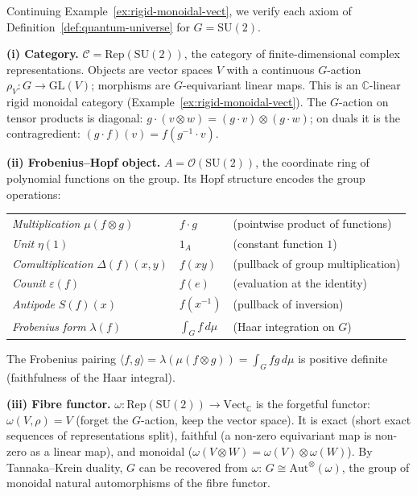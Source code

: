 \begin{example}
\label{ex:quantum-universe-su2}
Continuing Example~\ref{ex:rigid-monoidal-vect}, we verify each axiom
of Definition~\ref{def:quantum-universe} for $G = \mathrm{SU}(2)$.

\medskip\noindent\textbf{(i) Category.}\;
$\mathcal{C} = \mathrm{Rep}(\mathrm{SU}(2))$, the category of
finite-dimensional complex representations.  Objects are vector spaces
$V$ with a continuous $G$-action $\rho_V \colon G \to \mathrm{GL}(V)$;
morphisms are $G$-equivariant linear maps.  This is an
$\mathbb{C}$-linear rigid monoidal category
(Example~\ref{ex:rigid-monoidal-vect}).  The $G$-action on tensor
products is diagonal: $g \cdot (v \otimes w) = (g \cdot v) \otimes
(g \cdot w)$; on duals it is the contragredient:
$(g \cdot f)(v) = f(g^{-1} \cdot v)$.

\medskip\noindent\textbf{(ii) Frobenius--Hopf object.}\;
$A = \mathcal{O}(\mathrm{SU}(2))$, the coordinate ring of polynomial
functions on the group.  Its Hopf structure encodes the group operations:
\begin{center}
\renewcommand{\arraystretch}{1.3}
\begin{tabular}{l@{\;\;$=$\;\;}l@{\qquad}l}
  \emph{Multiplication} $\mu(f \otimes g)$ & $f \cdot g$
    & (pointwise product of functions) \\
  \emph{Unit} $\eta(1)$ & $1_A$
    & (constant function $1$) \\
  \emph{Comultiplication} $\Delta(f)(x, y)$ & $f(xy)$
    & (pullback of group multiplication) \\
  \emph{Counit} $\varepsilon(f)$ & $f(e)$
    & (evaluation at the identity) \\
  \emph{Antipode} $S(f)(x)$ & $f(x^{-1})$
    & (pullback of inversion) \\
  \emph{Frobenius form} $\lambda(f)$ & $\int_G f\, d\mu$
    & (Haar integration on $G$) \\
\end{tabular}
\end{center}
The Frobenius pairing
$\langle f, g \rangle = \lambda(\mu(f \otimes g)) = \int_G f g\, d\mu$
is positive definite (faithfulness of the Haar integral).

\medskip\noindent\textbf{(iii) Fibre functor.}\;
$\omega \colon \mathrm{Rep}(\mathrm{SU}(2)) \to
\mathrm{Vect}_{\mathbb{C}}$ is the forgetful functor: $\omega(V, \rho)
= V$ (forget the $G$-action, keep the vector space).  It is exact
(short exact sequences of representations split), faithful (a non-zero
equivariant map is non-zero as a linear map), and monoidal
($\omega(V \otimes W) = \omega(V) \otimes \omega(W)$).
By Tannaka--Krein duality, $G$ can be recovered from $\omega$:
$G \cong \mathrm{Aut}^{\otimes}(\omega)$, the group of monoidal natural
automorphisms of the fibre functor.


\end{example}
